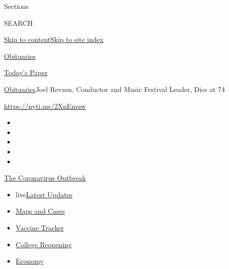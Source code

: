 Sections

SEARCH

\protect\hyperlink{site-content}{Skip to
content}\protect\hyperlink{site-index}{Skip to site index}

\href{https://www.nytimes3xbfgragh.onion/section/obituaries}{Obituaries}

\href{https://myaccount.nytimes3xbfgragh.onion/auth/login?response_type=cookie\&client_id=vi}{}

\href{https://www.nytimes3xbfgragh.onion/section/todayspaper}{Today's
Paper}

\href{/section/obituaries}{Obituaries}\textbar{}Joel Revzen, Conductor
and Music Festival Leader, Dies at 74

\url{https://nyti.ms/2XnEmuw}

\begin{itemize}
\item
\item
\item
\item
\item
\end{itemize}

\href{https://www.nytimes3xbfgragh.onion/news-event/coronavirus?action=click\&pgtype=Article\&state=default\&region=TOP_BANNER\&context=storylines_menu}{The
Coronavirus Outbreak}

\begin{itemize}
\tightlist
\item
  live\href{https://www.nytimes3xbfgragh.onion/2020/08/04/world/coronavirus-covid-19.html?action=click\&pgtype=Article\&state=default\&region=TOP_BANNER\&context=storylines_menu}{Latest
  Updates}
\item
  \href{https://www.nytimes3xbfgragh.onion/interactive/2020/us/coronavirus-us-cases.html?action=click\&pgtype=Article\&state=default\&region=TOP_BANNER\&context=storylines_menu}{Maps
  and Cases}
\item
  \href{https://www.nytimes3xbfgragh.onion/interactive/2020/science/coronavirus-vaccine-tracker.html?action=click\&pgtype=Article\&state=default\&region=TOP_BANNER\&context=storylines_menu}{Vaccine
  Tracker}
\item
  \href{https://www.nytimes3xbfgragh.onion/2020/08/02/us/covid-college-reopening.html?action=click\&pgtype=Article\&state=default\&region=TOP_BANNER\&context=storylines_menu}{College
  Reopening}
\item
  \href{https://www.nytimes3xbfgragh.onion/live/2020/08/03/business/stock-market-today-coronavirus?action=click\&pgtype=Article\&state=default\&region=TOP_BANNER\&context=storylines_menu}{Economy}
\end{itemize}

